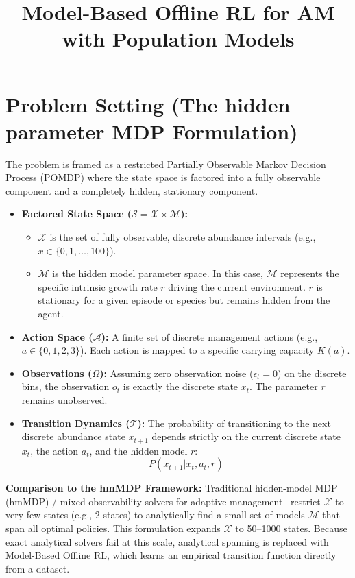 \documentclass[11pt]{article}
\title{Model-Based Offline RL for AM with Population Models}
\begin{document}
\maketitle

\setcounter{tocdepth}{2}
\tableofcontents
\newpage

\section{Problem Setting (The hidden parameter MDP Formulation)}
The problem is framed as a restricted Partially Observable Markov Decision Process (POMDP) where the state space is factored into a fully observable component and a completely hidden, stationary component.

\begin{itemize}
    \item \textbf{Factored State Space ($\mathcal{S} = \mathcal{X} \times \mathcal{M}$):}
    \begin{itemize}
        \item $\mathcal{X}$ is the set of fully observable, discrete abundance intervals (e.g., $x \in \{0, 1, \dots, 100\}$).
        \item $\mathcal{M}$ is the hidden model parameter space. In this case, $\mathcal{M}$ represents the specific intrinsic growth rate $r$ driving the current environment. $r$ is stationary for a given episode or species but remains hidden from the agent.
    \end{itemize}
    
    \item \textbf{Action Space ($\mathcal{A}$):} A finite set of discrete management actions (e.g., $a \in \{0, 1, 2, 3\}$). Each action is mapped to a specific carrying capacity $K(a)$.
    
    \item \textbf{Observations ($\Omega$):} Assuming zero observation noise ($\epsilon_t = 0$) on the discrete bins, the observation $o_t$ is exactly the discrete state $x_t$. The parameter $r$ remains unobserved.
    
    \item \textbf{Transition Dynamics ($\mathcal{T}$):} The probability of transitioning to the next discrete abundance state $x_{t+1}$ depends strictly on the current discrete state $x_t$, the action $a_t$, and the hidden model $r$: 
    $$P(x_{t+1} | x_t, a_t, r)$$
\end{itemize}

\noindent \textbf{Comparison to the hmMDP Framework:} Traditional hidden-model MDP (hmMDP) / mixed-observability solvers for adaptive management~\cite{chades2012momdp, memarzadeh2018} restrict $\mathcal{X}$ to very few states (e.g., 2 states) to analytically find a small set of models $\mathcal{M}$ that span all optimal policies. This formulation expands $\mathcal{X}$ to 50--1000 states. Because exact analytical solvers fail at this scale, analytical spanning is replaced with Model-Based Offline RL, which learns an empirical transition function directly from a dataset.
\end{document}

